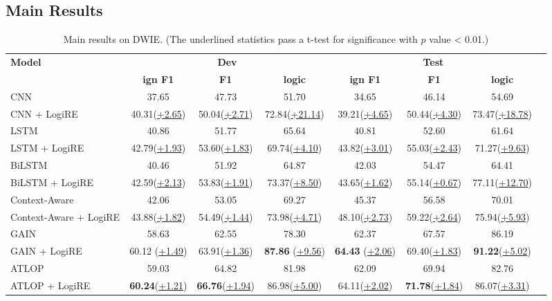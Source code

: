 \documentclass[11pt]{article}
\newcommand{\mymodel}{LogiRE\xspace}
\begin{document}
\subsection{Main Results}
\begin{table*}[t]
    \scriptsize
    \centering
    \begin{tabular}{lccccccc}
    \toprule
        \multirow{2}{*}{\bf Model} & \multicolumn{3}{c}{\bf Dev} & \multicolumn{3}{c}{\bf Test} \\ \cmidrule(lr){2-4} \cmidrule(lr){5-7}
        & \bf ign F1 & \bf F1  & \bf logic & \bf ign F1 & \bf F1 & \bf logic \\ \midrule
          CNN  & 37.65 & 47.73 & 51.70 & 34.65 & 46.14 & 54.69 \\
         CNN + \mymodel & {40.31}(\underline{+2.65}) & {50.04}(\underline{+2.71}) & {72.84}(\underline{+21.14}) & {39.21}(\underline{+4.65}) & {50.44}(\underline{+4.30}) & {73.47}(\underline{+18.78}) \\
          \midrule
        LSTM  & 40.86 & 51.77 & 65.64 & 40.81 & 52.60 & 61.64 \\
        LSTM + \mymodel & 42.79(\underline{+1.93}) & 53.60(\underline{+1.83}) & 69.74(\underline{+4.10}) & 43.82(\underline{+3.01}) & 55.03(\underline{+2.43}) & 71.27(\underline{+9.63}) \\
        \midrule
        BiLSTM  & 40.46 & 51.92 & 64.87 & 42.03 & 54.47 & 64.41 \\
        BiLSTM + \mymodel & 42.59(\underline{+2.13}) & 53.83(\underline{+1.91}) & 73.37(\underline{+8.50}) & 43.65(\underline{+1.62}) & 55.14(\underline{+0.67}) & 77.11(\underline{+12.70}) \\
        \midrule
        Context-Aware & 42.06 & 53.05 & 69.27 & 45.37 & 56.58 & 70.01 \\
        Context-Aware + \mymodel & 43.88(\underline{+1.82}) & 54.49(\underline{+1.44}) & 73.98(\underline{+4.71}) & 48.10(\underline{+2.73}) & 59.22(\underline{+2.64}) & 75.94(\underline{+5.93}) \\
        \midrule
        GAIN  & 58.63 & 62.55 & 78.30 & 62.37 & 67.57 & 86.19 \\ 
        GAIN + \mymodel & 60.12 (\underline{+1.49}) & 63.91(\underline{+1.36}) & \textbf{87.86} (\underline{+9.56}) & \textbf{64.43} (\underline{+2.06}) & 69.40(\underline{+1.83}) & \textbf{91.22}(\underline{+5.02}) \\
        \midrule
        ATLOP  & 59.03 & 64.82  & 81.98 & 62.09 & 69.94 & 82.76 \\ 
        ATLOP + \mymodel & \textbf{60.24}(\underline{+1.21}) & \textbf{66.76}(\underline{+1.94}) & 86.98(\underline{+5.00}) & 64.11(\underline{+2.02})  & \textbf{71.78}(\underline{+1.84}) & 86.07(\underline{+3.31}) \\
        \bottomrule
    \end{tabular}
    \caption{Main results on DWIE. (The underlined statistics pass a t-test for significance with $p$ value < 0.01.)}
    \label{tab:dwie}
\end{table*}
\end{document}
